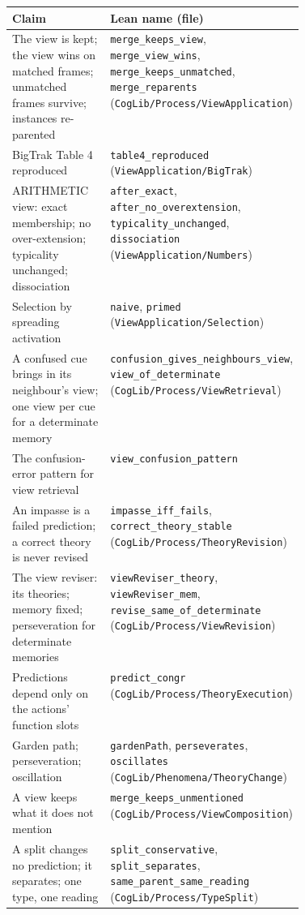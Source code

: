 \documentclass[11pt]{article}
\newcommand{\code}[1]{\texttt{#1}}
\newcommand{\lean}[1]{\texttt{#1}}
\begin{document}
\begin{table}[h]
\centering
\footnotesize
\begin{tabularx}{\linewidth}{@{}>{\raggedright\arraybackslash}p{0.42\linewidth}>{\raggedright\arraybackslash}X@{}}
\toprule
Claim & Lean name (file) \\
\midrule
The view is kept; the view wins on matched frames; unmatched frames survive; instances re-parented & \lean{merge\_keeps\_view}, \lean{merge\_view\_wins}, \lean{merge\_keeps\_unmatched}, \lean{merge\_reparents} (\code{CogLib/Process/ViewApplication}) \\
BigTrak Table 4 reproduced & \lean{table4\_reproduced} (\code{ViewApplication/BigTrak}) \\
ARITHMETIC view: exact membership; no over-extension; typicality unchanged; dissociation & \lean{after\_exact}, \lean{after\_no\_overextension}, \lean{typicality\_unchanged}, \lean{dissociation} (\code{ViewApplication/Numbers}) \\
Selection by spreading activation & \lean{naive}, \lean{primed} (\code{ViewApplication/Selection}) \\
A confused cue brings in its neighbour's view; one view per cue for a determinate memory & \lean{confusion\_gives\_neighbours\_view}, \lean{view\_of\_determinate} (\code{CogLib/Process/ViewRetrieval}) \\
The confusion-error pattern for view retrieval & \lean{view\_confusion\_pattern} \\
An impasse is a failed prediction; a correct theory is never revised & \lean{impasse\_iff\_fails}, \lean{correct\_theory\_stable} (\code{CogLib/Process/TheoryRevision}) \\
The view reviser: its theories; memory fixed; perseveration for determinate memories & \lean{viewReviser\_theory}, \lean{viewReviser\_mem}, \lean{revise\_same\_of\_determinate} (\code{CogLib/Process/ViewRevision}) \\
Predictions depend only on the actions' function slots & \lean{predict\_congr} (\code{CogLib/Process/TheoryExecution}) \\
Garden path; perseveration; oscillation & \lean{gardenPath}, \lean{perseverates}, \lean{oscillates} (\code{CogLib/Phenomena/TheoryChange}) \\
A view keeps what it does not mention & \lean{merge\_keeps\_unmentioned} (\code{CogLib/Process/ViewComposition}) \\
A split changes no prediction; it separates; one type, one reading & \lean{split\_conservative}, \lean{split\_separates}, \lean{same\_parent\_same\_reading} (\code{CogLib/Process/TypeSplit}) \\

\end{tabularx}
\end{table}
\end{document}
